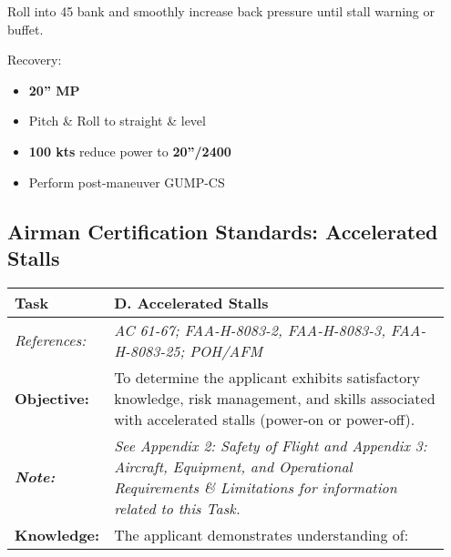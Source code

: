{Roll into 45\degree{} bank and smoothly increase back pressure until stall warning or buffet.

Recovery:
\begin{itemize}[label={}]
\item \textbf{20'' MP}
\item Pitch \& Roll to straight \& level
\item \textbf{100 kts} reduce power to \textbf{20''/2400}
\item Perform post-maneuver GUMP-CS
\end{itemize}
\newpage
\subsection{Airman Certification Standards: Accelerated Stalls}

\begin{table}[H]
\begin{tabular}%
  {>{\raggedleft\arraybackslash}p{0.15\linewidth}%
   >{\raggedright\arraybackslash}p{0.8\linewidth}%
  }
\textbf{Task}                                                       & \textbf{D. Accelerated Stalls}                                                                                                                                                                                                                           \\ \hline
\textit{References:}                                                & \textit{AC 61-67; FAA-H-8083-2, FAA-H-8083-3, FAA-H-8083-25; POH/AFM}                                                                                                                                                                                    \\
\textbf{Objective:}                                                 & To determine the applicant exhibits satisfactory knowledge, risk management, and skills associated with accelerated stalls (power-on or power-off).                                                                                                      \\
\textit{\textbf{Note:}}                                             & \textit{See Appendix 2: Safety of Flight and Appendix 3: Aircraft, Equipment, and Operational Requirements \& Limitations for information related to this Task.}                                                                                         \\ \hline
\textbf{Knowledge:}                                                 & The applicant demonstrates understanding of:                                                                                                                                                                                                             \\

\end{tabular}
\end{table}}
